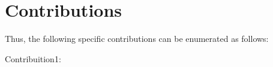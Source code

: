 

\section{Contributions}


Thus, the following specific contributions can be enumerated as follows:
\begin{description}
	\item[Contribuition1:] 
\end{description}


